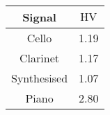 \begin{tabular}{|c|c|}
	\hline
	\bf{Signal} & $\boldsymbol{\mathrm{HV}}$ \tabularnewline
	\hline
	\hline
	Cello & 1.19 \tabularnewline
	\hline
	Clarinet & 1.17 \tabularnewline
	\hline
	Synthesised & 1.07 \tabularnewline
	\hline
	Piano & 2.80 \tabularnewline
	\hline
\end{tabular}
